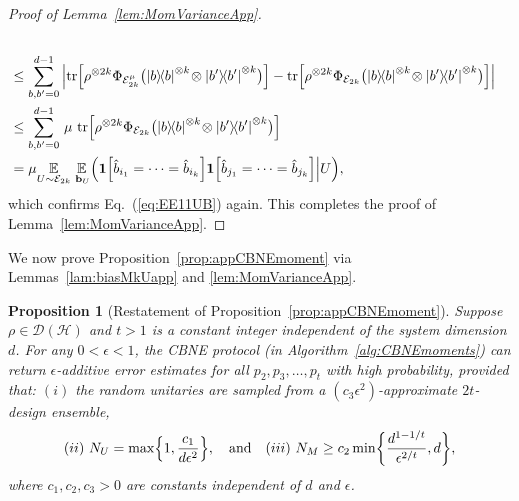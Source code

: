 \documentclass[aps,prl,twocolumn,nofootinbib,superscriptaddress,10pt]{revtex4-2}
\let\originalleft\left
\let\originalright\right
\renewcommand{\left}{\mathopen{}\mathclose\bgroup\originalleft}
\renewcommand{\right}{\aftergroup\egroup\originalright}
\def\E{ {\mathbb E} } %
\newcommand{\ketbra}[2]{\ensuremath{\left|#1\right\rangle\!\left\langle#2\right|}}
\DeclareMathOperator{\Tr}{tr}
\theoremstyle{plain}
\newtheorem{prop}{Proposition}
\theoremstyle{definition}
\newcommand{\caH}{\mathcal{H}}
\newcommand{\caD}{\mathcal{D}}
\newcommand{\eref}[1]{Eq.~\textup{(\ref{#1})}}
\newcommand{\lref}[1]{Lemma~\ref{#1}}
\newcommand{\pref}[1]{Proposition~\ref{#1}}
\begin{document}
\begin{proof}[Proof of \lref{lem:MomVarianceApp}]
\begin{align}
\nonumber\\
&\leq 
\sum_{b,b'=0}^{d-1}\, \left| 
\Tr \left[ \rho^{\otimes 2k}  \Phi_{\mathcal E_{2k}^\mu} \big( \ketbra{b}{b}^{\otimes k}\!\otimes \ketbra{b'}{b'}^{\otimes k} \big) \right] 
- \Tr \left[ \rho^{\otimes 2k}  \Phi_{\mathcal E_{2k}} \big( \ketbra{b}{b}^{\otimes k}\!\otimes \ketbra{b'}{b'}^{\otimes k} \big) \right] 
\right| 
\nonumber\\
&\leq  
\sum_{b,b'=0}^{d-1}\, \mu\,
\Tr \left[ \rho^{\otimes 2k}  \Phi_{\mathcal E_{2k}} \big( \ketbra{b}{b}^{\otimes k}\!\otimes \ketbra{b'}{b'}^{\otimes k} \big) \right] 
\nonumber\\
&= 
\mu \underset{U\sim \mathcal E_{2k}}{\E} \, \underset{\,\mathbf{b}_{U}}{\E} \Big(
\textbf{1}\left[\hat{b}_{i_1}=\dots=\hat{b}_{i_k}\right]  
\textbf{1}\left[\hat{b}_{j_1}=\dots=\hat{b}_{j_k}\right]  \Big| U \Big) ,
\end{align}
which confirms \eref{eq:EE11UB} again.
This completes the proof of \lref{lem:MomVarianceApp}.
\end{proof}


We now prove Proposition~\ref{prop:appCBNEmoment} via Lemmas~\ref{lam:biasMkUapp} and \ref{lem:MomVarianceApp}.


\begin{prop}[Restatement of \pref{prop:appCBNEmoment}]
\label{prop:appCBNEmomentSM}
Suppose $\rho\in\caD(\caH)$ and $t>1$ is a constant integer independent of the system dimension $d$.
For any $0<\epsilon<1$, the CBNE protocol (in Algorithm~\ref{alg:CBNEmoments}) can return $\epsilon$-additive error estimates for all 
$p_2,p_3,\dots,p_t$ with high probability, provided that: $(i)$ the random unitaries are sampled from a $(c_3\epsilon^2)$-approximate $2t$-design ensemble, 
\begin{align}
(ii) \ N_U= \max\left\lbrace 1, \dfrac{c_1}{d\epsilon^2} \right\rbrace ,  
\quad \text{and} \quad 
(iii) \ N_M\geq  c_2  \min\left\lbrace \frac{d^{1-1/t}}{\epsilon^{2/t}}, d \right\rbrace,     
\end{align}
where $c_1,c_2,c_3>0$ are constants  independent of $d$ and $\epsilon$. 
\end{prop}
\end{document}
